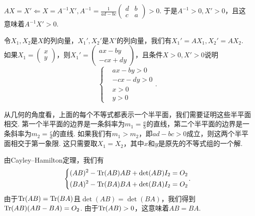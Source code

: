 \begin{solution}
  \begin{inparaenum}[(a)]
    \item $AX=X'\Leftarrow X=A^{-1}X',A^{-1}=\frac1{ad-bc}
        \begin{pmatrix}
          d & b \\
          c & a
        \end{pmatrix}>0$. 于是$A^{-1}>0,X'>0$，且这意味着$A^{-1}X'>0$.

    \item 令$X_1,X_2$是$X$的列向量，$X_1',X_2'$是$X'$的列向量，我们有$X_1'=AX_1,X_2'=AX_2$. 如果$X_1=\begin{pmatrix}
          x \\ y
        \end{pmatrix}$，则$X_1'=\begin{pmatrix}
          ax - by \\
          -cx + dy
        \end{pmatrix}$，且条件$X>0,X'>0$说明
        \[
          \left\{
            \begin{aligned}
              & ax - by > 0 \\
              & -cx - dy > 0 \\
              & x > 0 \\
              & y > 0
            \end{aligned}
          \right..
        \]

      从几何的角度看，上面的每个不等式都表示一个半平面，我们需要证明这些半平面相交. 第一个半平面的边界是一条斜率为$m_1=\frac ab$的直线，第二个半平面的边界是一条斜率为$m_2=\frac cd$的直线. 如果我们有$m_1>m_2$，即$ad-bc>0$成立，则这两个半平面相交于第一象限. 这只需要取$X_1=X_2$，其中$x$和$y$是原先的不等式组的一个解.
  \end{inparaenum}
\end{solution}

\setcounter{solution}{42}

\begin{solution}
  由Cayley--Hamilton定理，我们有
  \[
    \left\{
      \begin{aligned}
        & (AB)^2 - \Tr(AB)AB + \det(AB)I_2 = O_2 \\
        & (BA)^2 - \Tr(BA)BA + \det(BA)I_2 = O_2
      \end{aligned}
    \right..
  \]
  由于$\operatorname{Tr}(AB)=\operatorname{Tr}(BA)$且$\det(AB)=\det(BA)$，我们得到$\operatorname{Tr}(AB)(AB-BA)=O_2$. 由于$\operatorname{Tr}(AB)>0$，这意味着$AB=BA$.
\end{solution}

